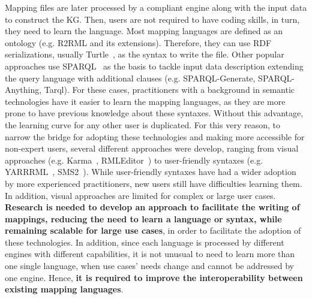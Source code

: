 
Mapping files are later processed by a compliant engine along with the input data to construct the KG. Then, users are not required to have coding skills, in turn, they need to learn the language. Most mapping languages are defined as an ontology (e.g. R2RML and its extensions). Therefore, they can use RDF serializations, usually Turtle~\citep{turtle}, as the syntax to write the file. Other popular approaches use SPARQL~\citep{harris2013sparql} as the basis to tackle input data description extending the query language with additional clauses (e.g. SPARQL-Generate, SPARQL-Anything, Tarql). For these cases, practitioners with a background in semantic technologies have it easier to learn the mapping languages, as they are more prone to have previous knowledge about these syntaxes. Without this advantage, the learning curve for any other user is duplicated. For this very reason, to narrow the bridge for adopting these technologies and making more accessible for non-expert users, several different approaches were develop, ranging from visual approaches (e.g. Karma~\citep{gupta2012karma}, RMLEditor~\citep{heyvaert2016rmleditor}) to user-friendly syntaxes (e.g. YARRRML~\citep{Heyvaert2018yarrrml}, SMS2~\citep{sms2}). While user-friendly syntaxes have had a wider adoption by more experienced practitioners, new users still have difficulties learning them. In addition, visual approaches are limited for complex or large user cases. \textbf{Research is needed to develop an approach to facilitate the writing of mappings, reducing the need to learn a language or syntax, while remaining scalable for large use cases}, in order to facilitate the adoption of these technologies. In addition, since each language is processed by different engines with different capabilities, it is not unusual to need to learn more than one single language, when use cases' needs change and cannot be addressed by one engine. Hence, \textbf{it is required to improve the interoperability between existing mapping languages}. 

